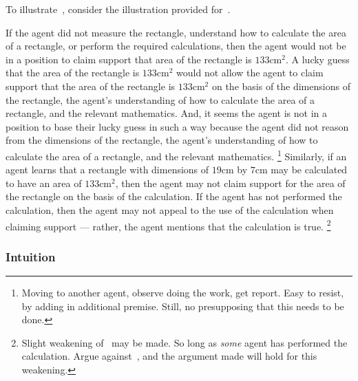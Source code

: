 \begin{note}[Illustration]
  To illustrate~\ESU{}, consider the illustration provided for~\USE{}.

    If the agent did not measure the rectangle, understand how to calculate the area of a rectangle, or perform the required calculations, then the agent would not be in a position to claim support that area of the rectangle is \(133\text{cm}^{2}\).
  A lucky guess that the area of the rectangle is \(133\text{cm}^{2}\) would not allow the agent to claim support that the area of the rectangle is  \(133\text{cm}^{2}\) on the basis of the dimensions of the rectangle, the agent's understanding of how to calculate the area of a rectangle, and the relevant mathematics.
  And, it seems the agent is not in a position to base their lucky guess in such a way because the agent did not reason from the dimensions of the rectangle, the agent's understanding of how to calculate the area of a rectangle, and the relevant mathematics.\nolinebreak
  \footnote{
    Moving to another agent, observe doing the work, get report.
    Easy to resist, by adding in additional premise.
    Still, no presupposing that this needs to be done.
  }
  Similarly, if an agent learns that a rectangle with dimensions of \(19\text{cm}\) by \(7\text{cm}\) may be calculated to have an area of \(133\text{cm}^{2}\), then the agent may not claim support for the area of the rectangle on the basis of the calculation.
  If the agent has not performed the calculation, then the agent may not appeal to the use of the calculation when claiming support --- rather, the agent mentions that the calculation is true.\nolinebreak
  \footnote{
    Slight weakening of~\ESU{} may be made.
    So long as \emph{some} agent has performed the calculation.
    Argue against~\ESU{}, and the argument made will hold for this weakening.
  }
\end{note}

\subsubsection{Intuition}

